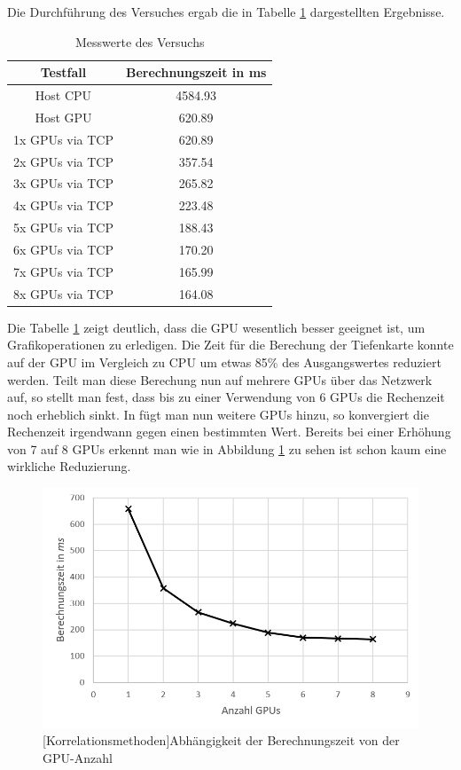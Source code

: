 \documentclass[times, 10pt,twocolumn]{article}
\begin{document}
Die Durchführung des Versuches ergab die in Tabelle \ref{tab:messwerte} dargestellten Ergebnisse.
\begin{table}
\begin{tabular}{|c|c|}
\hline
 \textbf{Testfall} & \textbf{Berechnungszeit in ms} \\
\hline
 Host CPU & 4584.93 \\
\hline
 Host GPU & 620.89  \\
\hline
 1x GPUs via TCP & 620.89  \\
\hline
 2x GPUs via TCP & 357.54  \\
 \hline
 3x GPUs via TCP & 265.82  \\
 \hline
 4x GPUs via TCP & 223.48  \\
 \hline
 5x GPUs via TCP & 188.43  \\
 \hline
 6x GPUs via TCP & 170.20  \\
 \hline
 7x GPUs via TCP & 165.99  \\
 \hline
 8x GPUs via TCP & 164.08  \\
 \hline
\end{tabular}
\caption{Messwerte des Versuchs}
\label{tab:messwerte}
\end{table}

Die Tabelle \ref{tab:messwerte} zeigt deutlich, dass die GPU wesentlich besser geeignet ist, um Grafikoperationen zu erledigen. Die Zeit für die Berechung der Tiefenkarte konnte auf der GPU im Vergleich zu CPU um etwas 85\% des Ausgangswertes reduziert werden. Teilt man diese Berechung nun auf mehrere GPUs über das Netzwerk auf, so stellt man fest, dass bis zu einer Verwendung von 6 GPUs die Rechenzeit noch erheblich sinkt. In fügt man nun weitere GPUs hinzu, so konvergiert die Rechenzeit irgendwann gegen einen bestimmten Wert. Bereits bei einer Erhöhung von 7 auf 8 GPUs erkennt man wie in Abbildung \ref{fig:dia} zu sehen ist schon kaum eine wirkliche Reduzierung.

\begin{figure}[!ht]
	\centering
	\includegraphics[width=0.9\linewidth]{image/geschw.png}
	[Korrelationsmethoden]{Abhängigkeit der Berechnungszeit von der GPU-Anzahl}
	\label{fig:dia}
\end{figure}
\end{document}
